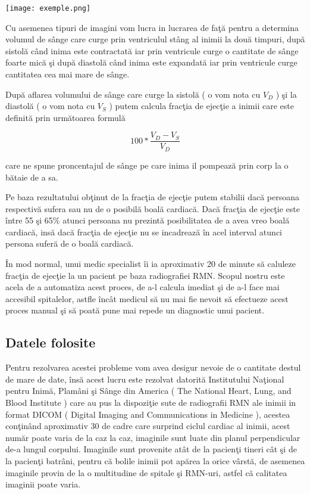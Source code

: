 \begin{center}
\texttt{[image: exemple.png]}
\end{center}

Cu asemenea tipuri de imagini vom lucra in lucrarea de fa\c{t}\u{a} pentru a determina volumul de s\^{a}nge care curge prin ventriculul st\^{a}ng al inimii la dou\u{a} timpuri, dup\u{a} sistol\u{a} c\^{a}nd inima este contractat\u{a} iar prin ventricule curge o cantitate de s\^{a}nge foarte mic\u{a} \c{s}i dup\u{a} diastol\u{a} c\^{a}nd inima este expandat\u{a} iar prin ventricule curge cantitatea cea mai mare de s\^{a}nge.
\par
Dup\u{a} aflarea volumului de s\^{a}nge care curge la sistol\u{a} ( o vom nota cu \textbf{\textit{$V_D$}} ) \c{s}i la diastol\u{a} ( o vom nota cu \textbf{\textit{$V_S$}} ) putem calcula frac\c{t}ia de ejec\c{t}ie a inimii care este definit\u{a} prin urm\u{a}toarea formul\u{a}

$$100 * \frac{V_D - V_S}{V_D}$$

care ne spune proncentajul de s\^{a}nge pe care inima il pompeaz\u{a} prin corp la o b\u{a}taie de a sa.
\par
Pe baza rezultatului ob\c{t}inut de la frac\c{t}ia de ejec\c{t}ie putem stabilii dac\u{a} persoana respectiv\u{a} sufera sau nu de o posibil\u{a} boal\u{a} cardiac\u{a}. Dac\u{a} frac\c{t}ia de ejec\c{t}ie este \^{i}ntre 55 \c{s}i 65\% atunci persoana nu prezint\u{a} posibilitatea de a avea vreo boal\u{a} cardiac\u{a}, ins\u{a} dac\u{a} frac\c{t}ia de ejec\c{t}ie nu se incadreaz\u{a} \^{i}n acel interval atunci persona sufer\u{a} de o boal\u{a} cardiac\u{a}.
\par
\^{I}n mod normal, unui medic specialist \^{i}i ia aproximativ 20 de minute s\u{a} caluleze frac\c{t}ia de ejec\c{t}ie la un pacient pe baza radiografiei RMN. Scopul nostru este acela de a automatiza acest proces, de a-l calcula imediat \c{s}i de a-l face mai accesibil spitalelor, astfle \^{i}nc\^{a}t medicul s\u{a} nu mai fie nevoit s\u{a} efectueze acest proces manual \c{s}i s\u{a} poat\u{a} pune mai repede un diagnostic unui pacient.

\subsection{Datele folosite}

Pentru rezolvarea acestei probleme vom avea desigur nevoie de o cantitate destul de mare de date, \^{i}ns\u{a} acest lucru este rezolvat datorit\u{a} Institutului Na\c{t}ional pentru Inim\u{a}, Plam\^{a}ni \c{s}i S\^{a}nge din America ( The National Heart, Lung, and Blood Institute ) care au pus la dispozi\c{t}ie sute de radiografii RMN ale inimii in format DICOM ( Digital Imaging and Communications in Medicine ), acestea con\c{t}in\^{a}nd aproximativ 30 de cadre care surprind ciclul cardiac al inimii, acest num\u{a}r poate varia de la caz la caz, imaginile sunt luate din planul perpendicular de-a lungul corpului. Imaginile sunt provenite at\^{a}t de la pacien\c{t}i tineri c\^{a}t \c{s}i de la pacien\c{t}i batr\^{a}ni, pentru c\u{a} bolile inimii pot ap\u{a}rea la orice v\^{a}rst\u{a}, de asemenea imaginile provin de la o multitudine de spitale \c{s}i RMN-uri, astfel c\u{a} calitatea imaginii poate varia.

